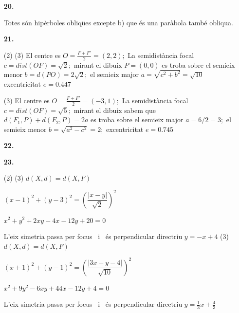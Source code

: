 \documentclass{book}
\newenvironment{pageandsolTwo}[2][]{

\newpage

\heading{Solucions de la pàgina #2:}
\normalfont
	\vspace{0.25cm}
  \begin{multicols}{2}
}{
\end{multicols} 
 \vspace{0.25cm}

}
\begin{document}
\begin{pageandsolTwo}{136}
\begin{enumerate}
\mbox{}\vspace{0.25cm}
\item[\fontfamily{phv}\selectfont\large\color{blue}\textbf{20. }] 

 Totes són hipèrboles obliqües excepte b) que és una paràbola també obliqua. \par {}
\mbox{}\vspace{0.25cm}

\item[\fontfamily{phv}\selectfont\large\color{blue}\textbf{21. }] 

 \begin{tasks}[label-format=\bfseries\large](2)
	 \task*(3) El centre es $O=\frac {F+F'}{2}=(2,2)$;\, La semidistància focal $c=dist(OF)=\sqrt {2}$;\, mirant el dibuix $P=(0,0)$ es troba sobre el semieix menor $b=d(PO)=2\sqrt {2}$;\, el semieix major $a=\sqrt {c^2+b^2}=\sqrt {10}$ excentricitat $e=0.447$ \par {}
	 \task*(3) El centre es $O=\frac {F+F'}{2}=(-3,1)$;\, La semidistància focal $c=dist(OF)=\sqrt {5}$;\, mirant el dibuix sabem que $d(F_1,P)+d(F_2,P)=2a$ es troba sobre el semieix major $a=6/2=3$;\, el semieix menor $b=\sqrt {a^2-c^2}=2$;\, excentricitat $e=0.745$ \par {} 
\end{tasks}

\mbox{}\vspace{0.25cm}
\item[\fontfamily{phv}\selectfont\large\color{blue}\textbf{22. }] 

\mbox {}\par {}
\mbox{}\vspace{0.25cm}

\item[\fontfamily{phv}\selectfont\large\color{blue}\textbf{23. }] 

 \begin{tasks}[label-format=\bfseries\large](2)
	 \task*(3)  $d(X,d)=d(X,F)$\par $(x-1)^2+(y-3)^2=\left ( \dfrac {|x-y|}{\sqrt {2}} \right )^2$\par $x^2+y^2+2xy-4x-12y+20=0$\par L'eix simetria passa per focus \, i \, és perpendicular directriu $y=-x+4$
	 \task*(3) $d(X,d)=d(X,F)$\par $(x+1)^2+(y-1)^2=\left ( \dfrac {|3x+y-4|}{\sqrt {10}} \right )^2$\par $x^2+9y^2-6xy+44x-12y+4=0$\par L'eix simetria passa per focus \, i \, és perpendicular directriu $y=\frac {1}{3}x+\frac {4}{3}$ \par {} 
\end{tasks}


\end{enumerate}
\end{pageandsolTwo}
\end{document}
